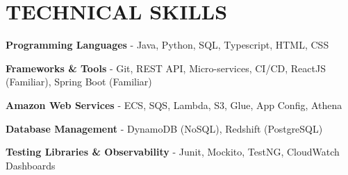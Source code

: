 \section{TECHNICAL SKILLS}

\begin{onecolentry}
    \textbf{Programming Languages} - Java, Python, SQL, Typescript, HTML, CSS
\end{onecolentry}

\vspace{0.1 cm}

\begin{onecolentry}
    \textbf{Frameworks \& Tools} - Git, REST API, Micro-services, CI/CD, ReactJS \small{(Familiar)}, Spring Boot \small{(Familiar)}
\end{onecolentry}

\vspace{0.1 cm}

\begin{onecolentry}
    \textbf{Amazon Web Services} - ECS, SQS, Lambda, S3, Glue, App Config, Athena
\end{onecolentry}

\vspace{0.1 cm}

\begin{onecolentry}
    \textbf{Database Management}  - DynamoDB \small{(NoSQL)}, Redshift \small{(PostgreSQL)}
\end{onecolentry}

\vspace{0.1 cm}

\begin{onecolentry}
    \textbf{Testing Libraries \& Observability}  - Junit, Mockito, TestNG, CloudWatch Dashboards
\end{onecolentry}
